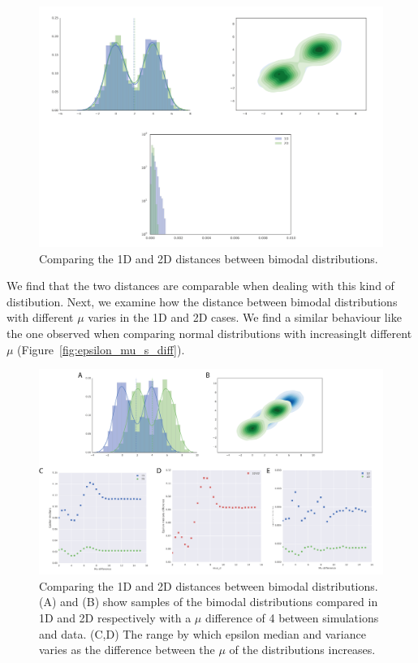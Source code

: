 \begin{figure}[htbp]
\centering
\includegraphics[scale=0.6]{chapterABCFlow/images/multimodal.png}
\caption{Comparing the 1D and 2D distances between bimodal distributions. }
\label{fig:multimodal}
\end{figure}
 We find that the two distances are comparable when dealing with this kind of distibution. Next, we examine how the distance between bimodal distributions with different $\mu$ varies in the 1D and 2D cases. We find a similar behaviour like the one observed when comparing normal distributions with increasinglt different $\mu$ (Figure~\ref{fig:epsilon_mu_s_diff}). 
\begin{figure}[htbp]
\centering
\includegraphics[scale=0.6]{chapterABCFlow/images/multimodal_musd.png}
\caption[LoF caption]{Comparing the 1D and 2D distances between bimodal distributions. (A) and (B) show samples of the bimodal distributions compared in 1D and 2D respectively with a $\mu$ difference of 4 between simulations and data. (C,D) The range by which epsilon median and variance varies as the difference between the $\mu$ of the distributions increases.}
\label{fig:multimodal_musd}
\end{figure}
\clearpage


